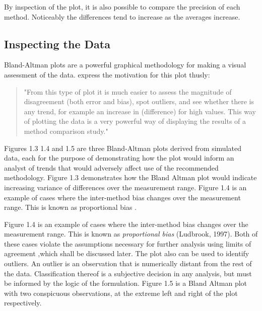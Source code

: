\documentclass{report}
\begin{document}
\newpage
By inspection of the plot, it is also possible to compare the
precision of each method. Noticeably the differences tend to
increase as the averages increase.

\subsection{Inspecting the Data}
Bland-Altman plots are a powerful graphical methodology for making
a visual assessment of the data. \citet*{BA83} express the
motivation for this plot thusly:
\begin{quote}
	"From this type of plot it is much easier to assess the magnitude
	of disagreement (both error and bias), spot outliers, and see
	whether there is any trend, for example an increase in
	(difference) for high values. This way of plotting the data is a
	very powerful way of displaying the results of a method comparison
	study."
\end{quote}


Figures 1.3 1.4 and 1.5 are three Bland-Altman plots derived from
simulated data, each for the purpose of demonstrating how the plot
would inform an analyst of trends that would adversely affect use
of the recommended methodology. Figure 1.3 demonstrates how the
Bland Altman plot would indicate increasing variance of
differences over the measurement range. Figure 1.4 is an example
of cases where the inter-method bias changes over the measurement
range. This is known as proportional bias \citep{ludbrook97}.


%

\newpage
Figure 1.4 is an example of cases where the inter-method bias
changes over the measurement range. This is known as\textit{ proportional
bias} (Ludbrook, 1997). Both of these cases violate the assumptions
necessary for further analysis using limits of agreement ,which
shall be discussed later. The plot also can be used to identify
outliers. An outlier is an observation that is numerically distant
from the rest of the data. Classification thereof is a subjective
decision in any analysis, but must be informed by the logic of the
formulation. Figure 1.5 is a Bland Altman plot with two
conspicuous observations, at the extreme left and right of the
plot respectively.
\end{document}
